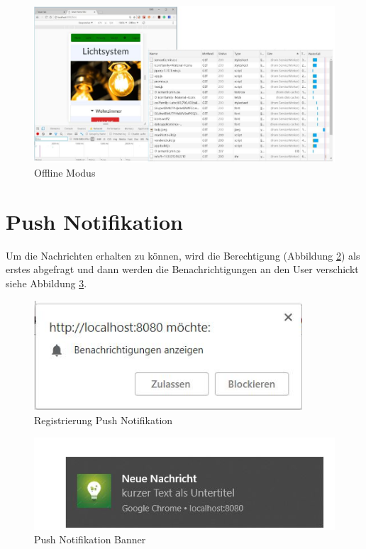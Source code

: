 \begin{figure}[h]
	\centering
	\includegraphics[width=14cm]{BilderAllgemein/Offline}\medskip
	\caption{Offline Modus}
	\label{fig:Offline}
\end{figure}

\newpage

\section{Push Notifikation}
Um die Nachrichten erhalten zu können, wird die Berechtigung (Abbildung \ref{fig:Registrierung}) als erstes abgefragt und dann werden die Benachrichtigungen an den User verschickt siehe Abbildung \ref{fig:Nachricht}.

\begin{figure}[h]
	\centering
	\includegraphics[width=10cm]{BilderAllgemein/PushNotification/Registrierung}\medskip
	\caption{Registrierung Push Notifikation}
	\label{fig:Registrierung}
\end{figure}

\begin{figure}[h]
	\centering
	\includegraphics[width=14cm]{BilderAllgemein/PushNotification/Nachricht}\medskip
	\caption{Push Notifikation Banner}
	\label{fig:Nachricht}
\end{figure}
\newpage

